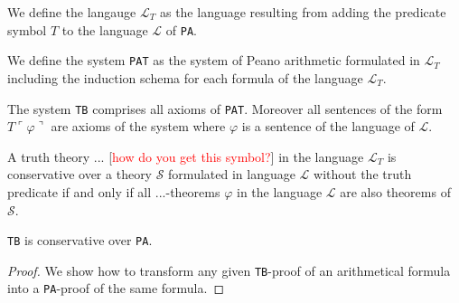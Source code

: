 %

\begin{definition}[$\mathcal{L}_T$]
    \label{def:LT}
    We define the langauge $\mathcal{L}_T$ as the language resulting from adding the predicate symbol $T$ to the language $\mathcal{L}$ of \texttt{PA}. 
\end{definition}

\begin{definition}
    \label{def:PAT}
    We define the system \texttt{PAT} as the system of Peano arithmetic formulated in $\mathcal{L}_T$ including the induction schema for each formula of the language $\mathcal{L}_T$.
\end{definition}

\begin{definition}[\texttt{TB}]
    \label{def:TB}
    The system \texttt{TB} comprises all axioms of \texttt{PAT}. Moreover all sentences of the form $T\ulcorner\varphi\urcorner$ are axioms of the system where $\varphi$ is a sentence of the language of $\mathcal{L}$.
\end{definition}

\begin{definition}[conservativity]
    \label{def:cons}
    A truth theory $...$ [\textcolor{red}{how do you get this symbol?}] in the language $\mathcal{L}_T$ is conservative over a theory $\mathcal{S}$ formulated in language $\mathcal{L}$ without the truth predicate if and only if all $...$-theorems $\varphi$ in the language $\mathcal{L}$ are also theorems of $\mathcal{S}$.
\end{definition}

\begin{theorem}
    \label{thm:tb-cons}
    \texttt{TB} is conservative over \texttt{PA}.
\end{theorem}

\begin{proof}    We show how to transform any given \texttt{TB}-proof of an arithmetical formula into a \texttt{PA}-proof of the same formula. 

\end{proof}
